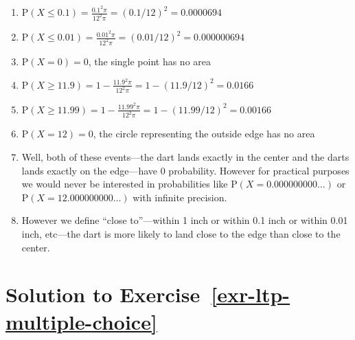 \documentclass[
  letterpaper,
  DIV=11,
  numbers=noendperiod]{scrreprt}
\providecommand{\tightlist}{%
  \setlength{\itemsep}{0pt}\setlength{\parskip}{0pt}}
\theoremstyle{plain}
\theoremstyle{definition}
\theoremstyle{definition}
\theoremstyle{definition}
\theoremstyle{remark}
\begin{document}
\begin{enumerate}
\def\labelenumi{\arabic{enumi}.}
\tightlist
\item
  \(\textrm{P}(X \le 0.1) = \frac{0.1^2\pi}{12^2\pi} = (0.1/12)^2 = 0.0000694\)
\item
  \(\textrm{P}(X \le 0.01) = \frac{0.01^2\pi}{12^2\pi} = (0.01/12)^2 = 0.000000694\)
\item
  \(\textrm{P}(X = 0) = 0\), the single point has no area
\item
  \(\textrm{P}(X \ge 11.9) = 1 - \frac{11.9^2\pi}{12^2\pi} = 1 - (11.9/12)^2 = 0.0166\)
\item
  \(\textrm{P}(X \ge 11.99) = 1 - \frac{11.99^2\pi}{12^2\pi} = 1 - (11.99/12)^2 = 0.00166\)
\item
  \(\textrm{P}(X = 12) = 0\), the circle representing the outside edge
  has no area
\item
  Well, both of these events---the dart lands exactly in the center and
  the darts lands exactly on the edge---have 0 probability. However for
  practical purposes we would never be interested in probabilities like
  \(\textrm{P}(X = 0.000000000\ldots)\) or
  \(\textrm{P}(X = 12.000000000\ldots)\) with infinite precision.
\item
  However we define ``close to''---within 1 inch or within 0.1 inch or
  within 0.01 inch, etc---the dart is more likely to land close to the
  edge than close to the center.
\end{enumerate}

\section{\texorpdfstring{Solution to
Exercise~\ref{exr-ltp-multiple-choice}}{Solution to Exercise~}}\label{solution-to-exr-ltp-multiple-choice}
\end{document}
